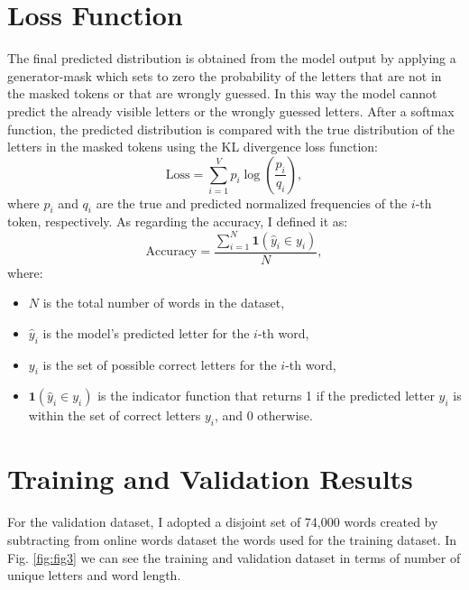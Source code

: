 \documentclass{report}
\begin{document}
\section*{Loss Function}
The final predicted distribution is obtained from the model output by applying a
generator-mask which sets to zero the probability of the letters that are not in the masked tokens or that are wrongly guessed.
In this way the model cannot predict the already visible letters or the wrongly guessed letters.
After a softmax function, the predicted distribution is compared with the true distribution of the letters in the masked tokens using
the \ac{KL} divergence loss function:
\begin{equation}
    \text{Loss} = \sum_{i=1}^{V} p_i \log \left( \frac{p_i}{q_i} \right),
\end{equation}
where $p_i$ and $q_i$ are the true and predicted normalized frequencies of the $i$-th token, respectively.
As regarding the accuracy, I defined it as:
\begin{equation}
    \text{Accuracy} = \frac{\sum_{i=1}^{N} \mathbf{1}(\hat{y}_i \in y_i)}{N},
\end{equation}
where:
\begin{itemize}
    \item $N$ is the total number of words in the dataset,
    \item $\hat{y}_i$ is the model's predicted letter for the $i$-th word,
    \item $y_i$ is the set of possible correct letters for the $i$-th word,
    \item $\mathbf{1}(\hat{y}_i \in y_i)$ is the indicator function that returns 1 if the predicted letter $\hat{y}_i$ is within the set of correct letters $y_i$, and 0 otherwise.
\end{itemize}

\section*{Training and Validation Results}
For the validation dataset, I adopted a disjoint set of 74,000 words created by 
subtracting from online words dataset the words used for the training dataset.
In Fig. \ref{fig:fig3} we can see the training and validation dataset in terms of number of unique letters and word length.
\end{document}
